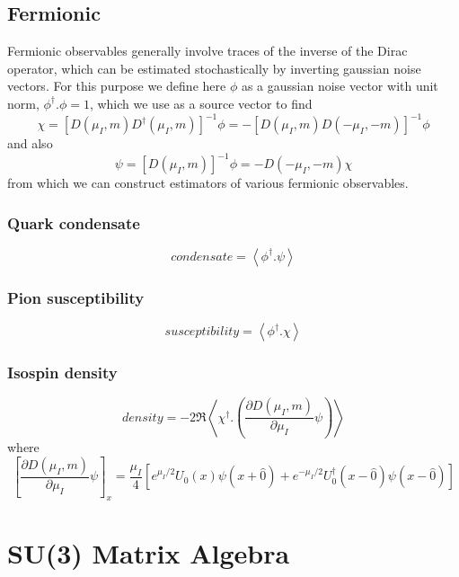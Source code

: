 \documentclass[a4paper,12pt]{article}
\begin{document}
\subsection{Fermionic}
Fermionic observables generally involve traces of the inverse of the Dirac operator, which can be estimated stochastically by 
inverting gaussian noise vectors. For this purpose we define here $\phi$ as a gaussian noise vector with unit norm, $\phi^{\dagger}.\phi=1$,
which we use as a source vector to find
\begin{equation}
 \chi = \left[D(\mu_I,m) D^{\dagger}(\mu_I,m)\right]^{-1} \phi = -\left[D(\mu_I,m) D(-\mu_I,-m)\right]^{-1} \phi
\end{equation}
and also
\begin{equation}
 \psi = \left[D(\mu_I,m)\right]^{-1} \phi = -D(-\mu_I,-m) \chi
\end{equation}
from which we can construct estimators of various fermionic observables.

\subsubsection{Quark condensate}
\begin{equation}
 condensate = \left\langle \phi^{\dagger}.\psi \right\rangle
\end{equation}

\subsubsection{Pion susceptibility}
\begin{equation}
 susceptibility = \left\langle \phi^{\dagger}.\chi \right\rangle
\end{equation}

\subsubsection{Isospin density}
\begin{equation}
 density = -2 \Re \left\langle \chi^{\dagger}.\left(\frac{\partial D(\mu_I,m)}{\partial\mu_I}\psi\right) \right\rangle
\end{equation}
where
\begin{equation}
 \left[\frac{\partial D(\mu_I,m)}{\partial\mu_I}\psi\right]_x =\frac{\mu_I}{4}\left[ e^{\mu_I/2} U_0(x) \psi(x+\hat0) + e^{-\mu_I/2} U^{\dagger}_0(x-\hat0) \psi(x-\hat0)\right]
\end{equation}
\appendix
\section{SU(3) Matrix Algebra}
\end{document}
